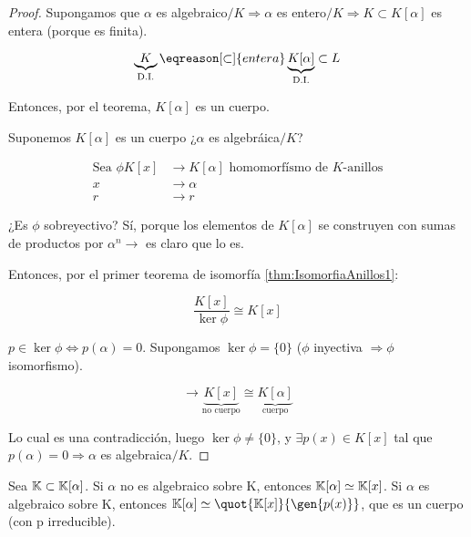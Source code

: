 	\begin{proof}

	\proofpart{$\implies$}

		Supongamos que $\alpha$ es algebraico$/K \Rightarrow \alpha$ es entero$/K \Rightarrow K \subset K[\alpha]$ es entera (porque es finita).

		\[ \underbrace{K}_{\text{D.I.}} \eqreason[\subset]{entera} \underbrace{K[\alpha]}_{\text{D.I.}} \subset L\]

		Entonces, por el teorema, $K[\alpha]$ es un cuerpo.

	\proofpart{$\impliedby$}

		Suponemos $K[\alpha]$ es un cuerpo ¿$\alpha$ es algebráica$/K$?

		\begin{align*}
			\text{Sea } \phi K[x] &\longrightarrow K[\alpha] \text{ homomorfísmo de }K\text{-anillos}\\
			x &\longrightarrow \alpha \\
			r &\longrightarrow r
		\end{align*}

		¿Es $\phi$ sobreyectivo? Sí, porque los elementos de $K[\alpha]$ se construyen con sumas de productos por $\alpha^n \rightarrow $ es claro que lo es.

		Entonces, por el primer teorema de isomorfía \ref{thm:IsomorfiaAnillos1}:

		\[ \frac{K[x]}{\ker \phi} \cong K[x]\]

		$p \in \ker \phi \Leftrightarrow p(\alpha) = 0 $. Supongamos $\ker \phi = \{0\}$ ($\phi$ inyectiva $\Rightarrow \phi$ isomorfismo).

		\[ \rightarrow \underbrace{K[x]}_{\text{no cuerpo}} \cong \underbrace{K[\alpha]}_{\text{cuerpo}}  \]

		Lo cual es una contradicción, luego $\ker \phi \neq \{0\}$, y $\exists p(x) \in K[x]$ tal que $p(\alpha) = 0 \Rightarrow \alpha $ es algebraica$/K$.
	\end{proof}

	

Sea  $\mathbb{K} \subset \mathbb{K}[\alpha]$. Si $\alpha$ no es algebraico sobre K, entonces $\mathbb{K}[\alpha]\simeq \mathbb{K}[x]$. Si $\alpha$ es algebraico sobre K, entonces $\K[\alpha] \simeq \quot{\K[x]}{\gen{p(x)}}$, que es un cuerpo (con p irreducible).


